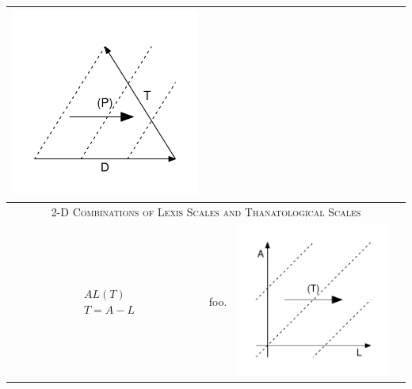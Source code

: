 \documentclass[
  12pt
]{scrartcl}
\begin{document}
\begin{center}
\begin{longtable}{m{}m{}m{}m{}}
  \includegraphics[width = \linewidth]{../fig/TDp_iso.pdf}  \\
  \midrule
  \multicolumn{4}{c}{\textsc{2-D Combinations of Lexis Scales and Thanatological Scales}} \\
  \midrule
  $$\begin{aligned}
    &AL(T) \\
    &T = A - L
  \end{aligned}$$ &
  foo. &
  \includegraphics[width = \linewidth]{../fig/ALt.pdf} &

\end{longtable}
\end{center}
\end{document}
